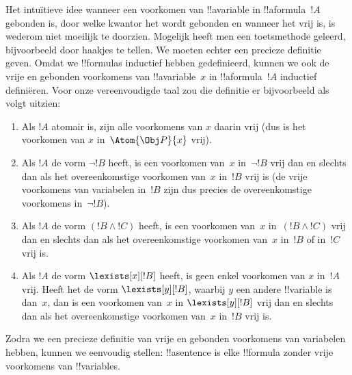\documentclass[openany]{memoir}
\begin{document}
Het intuïtieve idee wanneer een voorkomen van !!a{variable} in
!!a{formula}~$!A$ gebonden is, door welke kwantor het wordt gebonden en
wanneer het vrij is, is wederom niet moeilijk te doorzien. Mogelijk
heeft men een toetsmethode geleerd, bijvoorbeeld door haakjes te
tellen. We moeten echter een precieze definitie geven. Omdat we
!!{formula}s inductief hebben gedefinieerd, kunnen we ook de vrije en
gebonden voorkomens van !!a{variable}~$x$ in !!a{formula}~$!A$
inductief definiëren. Voor onze vereenvoudigde taal zou die definitie
er bijvoorbeeld als volgt uitzien:
\begin{enumerate}
  \item Als $!A$ atomair is, zijn alle voorkomens van $x$ daarin vrij
  (dus is het voorkomen van $x$ in~$\Atom{\Obj P}{x}$ vrij).
  \item Als $!A$ de vorm $\lnot !B$ heeft, is een voorkomen van~$x$
  in~$\lnot !B$ vrij dan en slechts dan als het overeenkomstige
  voorkomen van~$x$ in~$!B$ vrij is (de vrije voorkomens van variabelen
  in~$!B$ zijn dus precies de overeenkomstige voorkomens in~$\lnot !B$).
  \item Als $!A$ de vorm $(!B \land !C)$ heeft, is een voorkomen van~$x$
  in~$(!B \land !C)$ vrij dan en slechts dan als het overeenkomstige
  voorkomen van~$x$ in~$!B$ of in~$!C$ vrij is.
  \item Als $!A$ de vorm $\lexists[x][!B]$ heeft, is geen enkel voorkomen
  van $x$ in~$!A$ vrij. Heeft het de vorm $\lexists[y][!B]$, waarbij
  $y$ een andere !!{variable} is dan~$x$, dan is een voorkomen van~$x$
  in $\lexists[y][!B]$ vrij dan en slechts dan als het overeenkomstige
  voorkomen van~$x$ in~$!B$ vrij is.
\end{enumerate}

Zodra we een precieze definitie van vrije en gebonden voorkomens van
variabelen hebben, kunnen we eenvoudig stellen: !!a{sentence} is elke
!!{formula} zonder vrije voorkomens van !!{variable}s.
\endgroup

\begingroup
\def\olfilename{OLP-0145}
\def\olfilepath{content/first-order-logic/introduction/}
\hypertarget{unit-OLP-0145}{}
\end{document}
